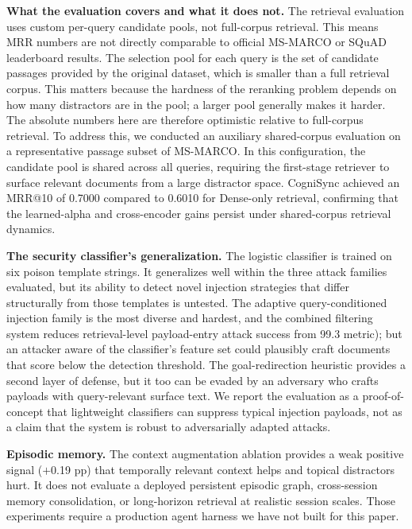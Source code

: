 \documentclass[sigconf]{acmart}
\begin{document}
\textbf{What the evaluation covers and what it does not.}
The retrieval evaluation uses custom per-query candidate pools, not full-corpus
retrieval. This means MRR numbers are not directly comparable to official
MS-MARCO or SQuAD leaderboard results. The selection pool for each query is
the set of candidate passages provided by the original dataset, which is smaller
than a full retrieval corpus. This matters because the hardness of the
reranking problem depends on how many distractors are in the pool; a larger
pool generally makes it harder. The absolute numbers here are therefore
optimistic relative to full-corpus retrieval. To address this, we conducted an auxiliary shared-corpus evaluation on a representative passage subset of MS-MARCO. In this configuration, the candidate pool is shared across all queries, requiring the first-stage retriever to surface relevant documents from a large distractor space. CogniSync achieved an MRR@10 of 0.7000 compared to 0.6010 for Dense-only retrieval, confirming that the learned-alpha and cross-encoder gains persist under shared-corpus retrieval dynamics.

\textbf{The security classifier's generalization.} The logistic classifier is
trained on six poison template strings. It generalizes well within the three
attack families evaluated, but its ability to detect novel injection strategies
that differ structurally from those templates is untested. The adaptive
query-conditioned injection family is the most diverse and hardest, and the combined filtering system reduces retrieval-level payload-entry attack
success from 99.3%
metric); but an attacker aware of the
classifier's feature set could plausibly craft documents that score below the
detection threshold. The goal-redirection heuristic provides a second layer of
defense, but it too can be evaded by an adversary who crafts payloads with
query-relevant surface text. We report the evaluation as a proof-of-concept that
lightweight classifiers can suppress typical injection payloads, not as a
claim that the system is robust to adversarially adapted attacks.

\textbf{Episodic memory.} The context augmentation ablation provides a weak
positive signal ($+$0.19 pp) that temporally relevant context helps and topical
distractors hurt. It does not evaluate a deployed persistent episodic graph,
cross-session memory consolidation, or long-horizon retrieval at realistic
session scales. Those experiments require a production agent harness we have not
built for this paper.
\end{document}
